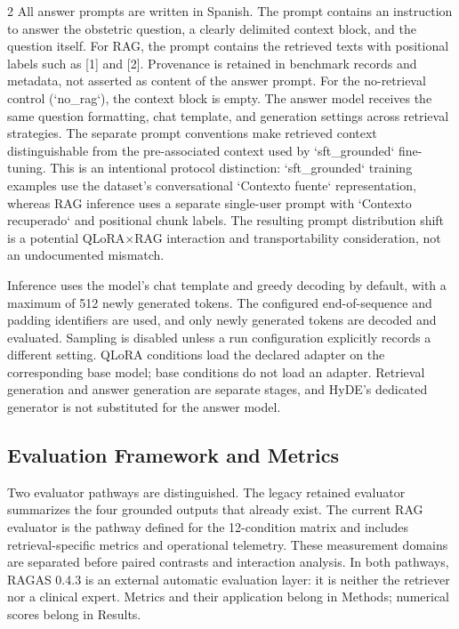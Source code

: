 \documentclass[11pt]{article}
\begin{document}
\begin{multicols}{2}
All answer prompts are written in Spanish. The prompt contains an instruction to answer the obstetric question, a clearly delimited context block, and the question itself. For RAG, the prompt contains the retrieved texts with positional labels such as [1] and [2]. Provenance is retained in benchmark records and metadata, not asserted as content of the answer prompt. For the no-retrieval control (`no\_rag`), the context block is empty. The answer model receives the same question formatting, chat template, and generation settings across retrieval strategies. The separate prompt conventions make retrieved context distinguishable from the pre-associated context used by `sft\_grounded` fine-tuning. This is an intentional protocol distinction: `sft\_grounded` training examples use the dataset's conversational `Contexto fuente` representation, whereas RAG inference uses a separate single-user prompt with `Contexto recuperado` and positional chunk labels. The resulting prompt distribution shift is a potential QLoRA$\times$RAG interaction and transportability consideration, not an undocumented mismatch.

Inference uses the model's chat template and greedy decoding by default, with a maximum of 512 newly generated tokens. The configured end-of-sequence and padding identifiers are used, and only newly generated tokens are decoded and evaluated. Sampling is disabled unless a run configuration explicitly records a different setting. QLoRA conditions load the declared adapter on the corresponding base model; base conditions do not load an adapter. Retrieval generation and answer generation are separate stages, and HyDE's dedicated generator is not substituted for the answer model.

\subsection{Evaluation Framework and Metrics}

Two evaluator pathways are distinguished. The legacy retained evaluator summarizes the four grounded outputs that already exist. The current RAG evaluator is the pathway defined for the 12-condition matrix and includes retrieval-specific metrics and operational telemetry. These measurement domains are separated before paired contrasts and interaction analysis. In both pathways, RAGAS 0.4.3 is an external automatic evaluation layer: it is neither the retriever nor a clinical expert. Metrics and their application belong in Methods; numerical scores belong in Results.


\end{multicols}
\end{document}
